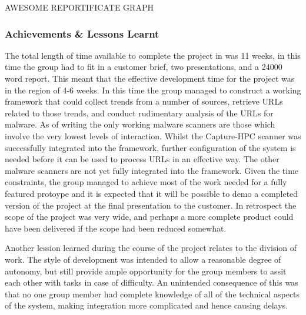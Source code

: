 AWESOME REPORTIFICATE GRAPH

\subsubsection{Achievements \& Lessons Learnt}

The total length of time available to complete the project in was 11 weeks, in
this time the group had to fit in a customer brief, two presentations, and a
24000 word report. This meant that the effective development time for the
project was in the region of 4-6 weeks. In this time the group managed to
construct a working framework that could collect trends from a number of
sources, retrieve URLs related to those trends, and conduct rudimentary analysis
of the URLs for malware. As of writing the only working malware scanners are
those which involve the very lowest levels of interaction. Whilst the
Capture-HPC scanner was successfully integrated into the framework, further
configuration of the system is needed before it can be used to process URLs in
an effective way. The other malware scanners are not yet fully integrated into
the framework. Given the time constraints, the group managed to achieve most of
the work needed for a fully featured protoype and it is expected that it will be
possible to demo a completed version of the project at the final presentation to
the customer. In retrospect the scope of the project was very wide, and perhaps
a more complete product could have been delivered if the scope had been reduced
somewhat.

Another lession learned during the course of the project relates to the division
of work. The style of development was intended to allow a reasonable degree of
autonomy, but still provide ample opportunity for the group members to assit
each other with tasks in case of difficulty. An unintended consequence of this
was that no one group member had complete knowledge of all of the technical
aspects of the system, making integration more complicated and hence causing
delays.

